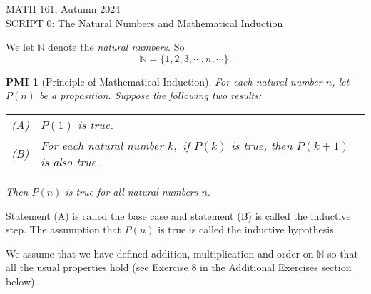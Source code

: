 \documentclass[11pt]{article}
\newcommand{\bbN}{\mathbb{N}}
\newcommand{\head}[1]{
	\begin{center}
		{\large #1}
		\vspace{.2 in}
	\end{center}
	
	\bigskip 
}
\newtheorem*{principle}{PMI}
\begin{document}
\pagestyle{plain}



\head{ MATH 161, Autumn 2024\\ SCRIPT 0: The Natural Numbers and Mathematical Induction} 


We let ${\mathbb N} $ denote the {\em natural numbers}. So $${\mathbb N}=\{1,2,3,\cdots,n,\cdots\}.$$


\begin{principle}[Principle of Mathematical Induction]  For each natural number $n$, let $P(n)$ be a proposition. 
Suppose the following two results:
\begin{center}
\begin{tabular}{ll}
(A) & $P(1)$ is true. \\
(B) & For each natural number $k,$ if $P(k)$ is true, then $P(k+1)$ is also true. \\
\end{tabular}
\end{center}
Then $P(n)$ is true for all natural numbers $n.$
\end{principle}

Statement (A) is called the base case and statement (B) is called the inductive step.  The assumption that $P(n)$ is true is called the inductive hypothesis.\medskip

We assume that we have defined addition, multiplication and order on $\bbN$ so that all the usual properties hold (see Exercise 8 in the Additional Exercises section below).
\end{document}
